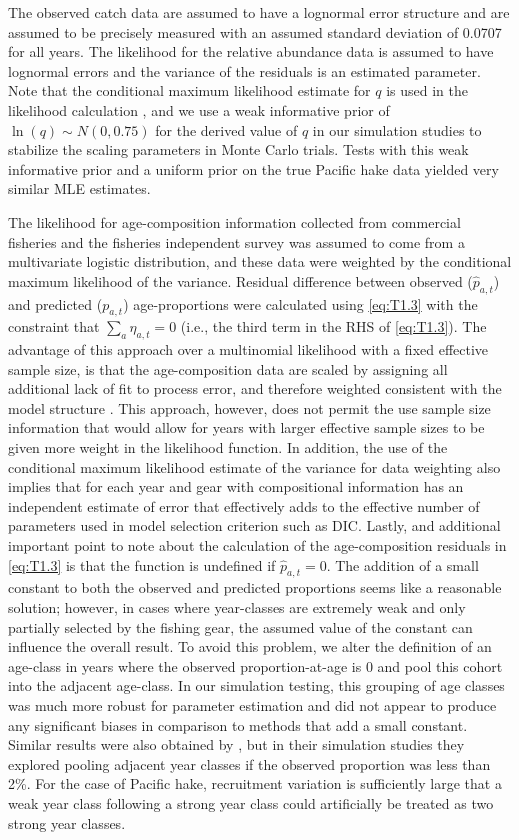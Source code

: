 \documentclass[review,letterpaper,10pt,authoryear]{elsarticle}
\begin{document}
The observed catch data are assumed to have a lognormal error structure and are assumed to be precisely measured with an assumed standard deviation of 0.0707 for all years. The likelihood for the relative abundance data is assumed to have lognormal errors and the variance of the residuals is an estimated parameter.  Note that the conditional maximum likelihood estimate for $q$ is used in the likelihood calculation \citep{walters1994calculation}, and we use a weak informative prior of $\ln(q) \sim N(0,0.75)$ for the derived value of $q$ in our simulation studies to stabilize the scaling parameters in Monte Carlo trials.  Tests with this weak informative prior and a uniform prior on the true Pacific hake data yielded very similar MLE estimates.

The likelihood for age-composition information collected from commercial fisheries and the fisheries independent survey was assumed to come from a  multivariate logistic distribution, and these data were weighted by the conditional maximum likelihood of the variance.  Residual difference between observed ($\hat{p}_{a,t}$) and predicted ($p_{a,t}$) age-proportions were calculated using \eqref{eq:T1.3} with the constraint that $\sum_a \eta_{a,t} = 0$ (i.e., the third term in the RHS of \eqref{eq:T1.3}).  The advantage of this approach over a multinomial likelihood with a fixed effective sample size, is that the age-composition data are scaled by assigning all additional lack of fit to process error, and therefore weighted consistent with the model structure \citep{schnute1995influence}. This approach, however, does not permit the use sample size information that would allow for years with larger effective sample sizes to be given more weight in the likelihood function. In addition, the use of the conditional maximum likelihood estimate of the variance for data weighting also implies that for each year and gear with compositional information has an independent estimate of error that effectively adds to the effective number of parameters used in model selection criterion such as DIC. Lastly, and additional important point to note about the calculation of the age-composition residuals in \eqref{eq:T1.3} is that the function is undefined if $\hat{p}_{a,t}=0$.  The addition of a small constant to both the observed and predicted proportions seems like a reasonable solution; however, in cases where year-classes are extremely weak and only partially selected by the fishing gear, the assumed value of the constant can influence the overall result.  To avoid this problem, we alter the definition of an age-class in years where the observed proportion-at-age is 0 and pool this cohort into the adjacent age-class.  In our simulation testing, this grouping of age classes was much more robust for parameter estimation and did not appear to produce any significant biases in comparison to methods that add a small constant.  Similar results were also obtained by \cite{richards1997visualizing}, but in their simulation studies they explored pooling adjacent year classes if the observed proportion was less than 2\%.  For the case of Pacific hake, recruitment variation is sufficiently large that a weak year class following a strong year class could artificially be treated as two strong year classes. 
\end{document}
